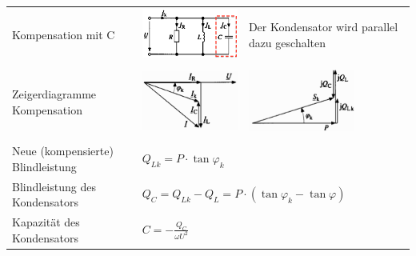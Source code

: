 \renewcommand{\arraystretch}{1.5}
\begin{tabular}{p{7cm}p{4.5cm}p{5cm}}
	Kompensation mit C &
    	\begin{minipage}{4cm}
        	\includegraphics[width=3.5cm]{bilder/Parallelkompensation.png}
        \end{minipage} & 
		Der Kondensator wird parallel dazu geschalten \\ \\
	Zeigerdiagramme Kompensation &
		\begin{minipage}{4.5cm}
        	\includegraphics[width=3.5cm]{bilder/Blindstromkompensation.png}
        \end{minipage} &
		\begin{minipage}{4.5cm}
        	\includegraphics[width=3.5cm]{bilder/Blindleistungskompensation.png}
        \end{minipage} \\ \\
	Neue (kompensierte) Blindleistung &
		$Q_{Lk} = P \cdot \tan{\varphi_k}$ \\
	Blindleistung des Kondensators & 
		\multicolumn{2}{l}{$Q_C = Q_{Lk} - Q_L =  P\cdot (\tan{\varphi_k}-\tan{\varphi}) $} \\
	Kapazität des Kondensators &
		$C = - \frac{Q_C}{\omega U^2}$ \\	
	\end{tabular}
\renewcommand{\arraystretch}{1}